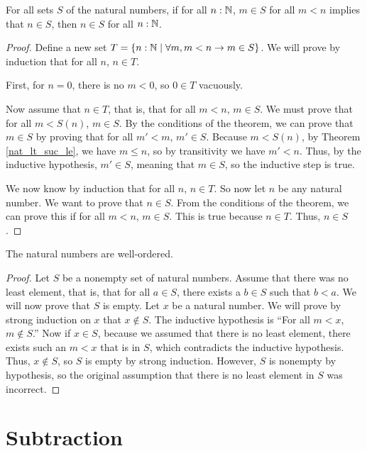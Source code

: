 \documentclass[../math.tex]{subfiles}
\begin{document}
\begin{theorem}
    For all sets $S$ of the natural numbers, if for all $n : \mathbb{N}$, $m \in S$ for
    all $m < n$ implies that $n \in S$, then $n \in S$ for all $n : \mathbb{N}$.
\end{theorem}
\begin{proof}
    Define a new set $T = \{n : \mathbb{N} \mid \forall m, m < n \rightarrow m \in S\}$.
    We will prove by induction that for all $n$, $n \in T$.

    First, for $n = 0$, there is no $m < 0$, so $0 \in T$ vacuously.

    Now assume that $n \in T$, that is, that for all $m < n$, $m \in S$.  We
    must prove that for all $m < S(n)$, $m \in S$.  By the conditions of the
    theorem, we can prove that $m \in S$ by proving that for all $m' < m$, $m'
    \in S$.  Because $m < S(n)$, by Theorem \ref{nat_lt_suc_le}, we have $m \leq
    n$, so by transitivity we have $m' < n$.  Thus, by the inductive hypothesis,
    $m' \in S$, meaning that $m \in S$, so the inductive step is true.

    We now know by induction that for all $n$, $n \in T$.  So now let $n$ be any
    natural number.  We want to prove that $n \in S$.  From the conditions of
    the theorem, we can prove this if for all $m < n$, $m \in S$.  This is true
    because $n \in T$.  Thus, $n \in S$.
\end{proof}

\begin{instance}
    The natural numbers are well-ordered.
\end{instance}
\begin{proof}
    Let $S$ be a nonempty set of natural numbers.  Assume that there was no
    least element, that is, that for all $a \in S$, there exists a $b \in S$
    such that $b < a$.  We will now prove that $S$ is empty.  Let $x$ be a
    natural number.  We will prove by strong induction on $x$ that $x \notin S$.
    The inductive hypothesis is ``For all $m < x$, $m \notin S$.''  Now if $x
    \in S$, because we assumed that there is no least element, there exists such
    an $m < x$ that is in $S$, which contradicts the inductive hypothesis.
    Thus, $x \notin S$, so $S$ is empty by strong induction.  However, $S$ is
    nonempty by hypothesis, so the original assumption that there is no least
    element in $S$ was incorrect.
\end{proof}

\section{Subtraction}
\end{document}
